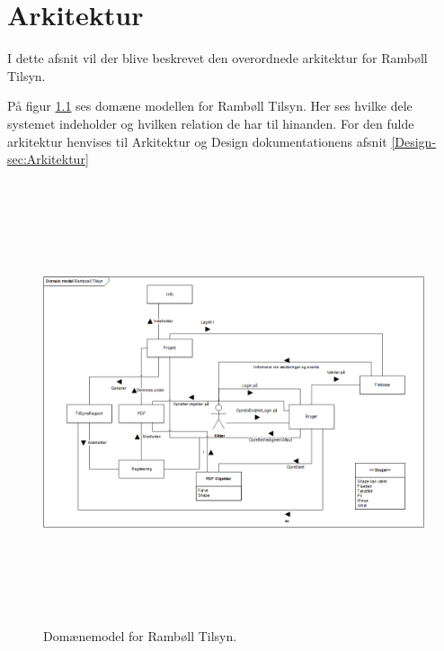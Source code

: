 \chapter{Arkitektur}
I dette afsnit vil der blive beskrevet den overordnede arkitektur for Rambøll Tilsyn.

På figur \ref{fig:Domain} ses domæne modellen for Rambøll Tilsyn. Her ses hvilke dele systemet indeholder og hvilken relation de har til hinanden.
For den fulde arkitektur henvises til Arkitektur og Design dokumentationens afsnit \ref{Design-sec:Arkitektur}

\begin{figure}[H] %
	\centering
	\includegraphics[height=13cm, width=17cm]{Arkitektur/Domainmodel}
	\caption{Domænemodel for Rambøll Tilsyn.}
	\label{fig:Domain}
\end{figure}

\clearpage
